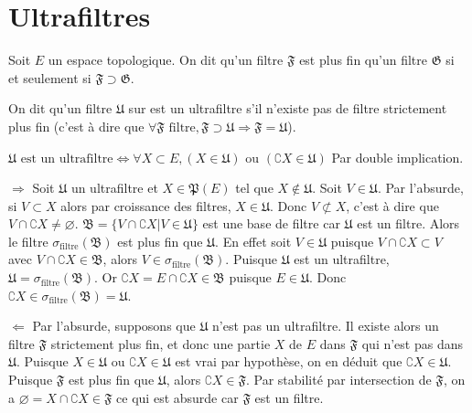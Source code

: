 \documentclass[a4paper, 11pt, french]{book}
\newenvironment{itemise}{\itemize}{\enditemize}
\theoremstyle{plain} %
\theoremstyle{definition} %
\theoremstyle{remark} %
\newcommand{\1}{\mathds{1}}
\newcommand\vide{\varnothing}
\newcommand\ou{\text{ ou }}
\begin{document}
\section{Ultrafiltres}

Soit $E$ un espace topologique.
On dit qu'un filtre $\mathfrak{F}$ est plus fin qu'un filtre $\mathfrak{G}$ si et seulement si $\mathfrak{F}\supset\mathfrak{G}$.

On dit qu'un filtre $\mathfrak{U}$ sur est un ultrafiltre s'il n'existe pas de filtre strictement plus fin (c'est à dire que $\forall\mathfrak{F}\text{ filtre}, \mathfrak{F}\supset\mathfrak{U}\Rightarrow\mathfrak{F}=\mathfrak{U}$).

\proposition
$\mathfrak{U}\text{ est un ultrafiltre}\iff\forall X\subset E, (X\in\mathfrak{U})\ou(\complement X\in\mathfrak{U})$
\demonstration
Par double implication.
\begin{itemise}
	\item[$\Rightarrow$] Soit $\mathfrak{U}$ un ultrafiltre et $X\in\mathfrak{P}(E)$ tel que $X\notin\mathfrak{U}$.
	Soit $V\in\mathfrak{U}$.
	Par l'absurde, si $V\subset X$ alors par croissance des filtres, $X\in\mathfrak{U}$.
	Donc $V\not\subset X$, c'est à dire que $V\cap\complement X\neq\vide$.
	$\mathfrak{B}=\{V\cap\complement X | V\in\mathfrak{U}\}$ est une base de filtre car $\mathfrak{U}$ est un filtre.
	Alors le filtre $\sigma_\text{filtre}(\mathfrak{B})$ est plus fin que $\mathfrak{U}$.
	En effet soit $V\in\mathfrak{U}$ puisque $V\cap\complement X\subset V$ avec $V\cap\complement X\in\mathfrak{B}$, alors $V\in\sigma_\text{filtre}(\mathfrak{B})$.
	Puisque $\mathfrak{U}$ est un ultrafiltre, $\mathfrak{U}=\sigma_\text{filtre}(\mathfrak{B})$.
	Or $\complement X=E\cap\complement X\in\mathfrak{B}$ puisque $E\in\mathfrak{U}$.
	Donc $\complement X\in\sigma_\text{filtre}(\mathfrak{B})=\mathfrak{U}$.
	\item[$\Leftarrow$] Par l'absurde, supposons que $\mathfrak{U}$ n'est pas un ultrafiltre.
	Il existe alors un filtre $\mathfrak{F}$ strictement plus fin, et donc une partie $X$ de $E$ dans $\mathfrak{F}$ qui n'est pas dans $\mathfrak{U}$.
	Puisque $X\in\mathfrak{U}\ou\complement X\in\mathfrak{U}$ est vrai par hypothèse, on en déduit que $\complement X\in\mathfrak{U}$.
	Puisque $\mathfrak{F}$ est plus fin que $\mathfrak{U}$, alors $\complement X\in\mathfrak{F}$.
	Par stabilité par intersection de $\mathfrak{F}$, on a $\vide=X\cap\complement X\in\mathfrak{F}$ ce qui est absurde car $\mathfrak{F}$ est un filtre.
\end{itemise}
\end{document}
